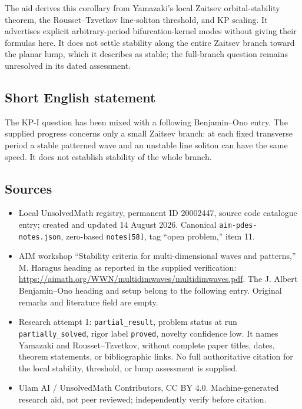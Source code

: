 \documentclass[11pt]{article}
\begin{document}
The aid derives this corollary from Yamazaki's local Zaitsev orbital-stability theorem, the Rousset--Tzvetkov line-soliton threshold, and KP scaling. It advertises explicit arbitrary-period bifurcation-kernel modes without giving their formulas here. It does not settle stability along the entire Zaitsev branch toward the planar lump, which it describes as stable; the full-branch question remains unresolved in its dated assessment.
\subsection{Short English statement}
The KP-I question has been mixed with a following Benjamin--Ono entry. The supplied progress concerns only a small Zaitsev branch: at each fixed transverse period a stable patterned wave and an unstable line soliton can have the same speed. It does not establish stability of the whole branch.
\subsection{Sources}
\begin{itemize}
\item Local UnsolvedMath registry, permanent ID 20002447, source code catalogue entry; created and updated 14 August 2026. Canonical \texttt{aim-pdes-notes.json}, zero-based \texttt{notes[58]}, tag ``open problem,'' item 11.
\item AIM workshop ``Stability criteria for multi-dimensional waves and patterns,'' M. Haragus heading as reported in the supplied verification: \url{https://aimath.org/WWN/multidimwaves/multidimwaves.pdf}. The J. Albert Benjamin--Ono heading and setup belong to the following entry. Original remarks and literature field are empty.
\item Research attempt 1: \texttt{partial\_result}, problem status at run \texttt{partially\_solved}, rigor label \texttt{proved}, novelty confidence low. It names Yamazaki and Rousset--Tzvetkov, without complete paper titles, dates, theorem statements, or bibliographic links. No full authoritative citation for the local stability, threshold, or lump assessment is supplied.
\item Ulam AI / UnsolvedMath Contributors, CC BY 4.0. Machine-generated research aid, not peer reviewed; independently verify before citation.
\end{itemize}
\end{document}
